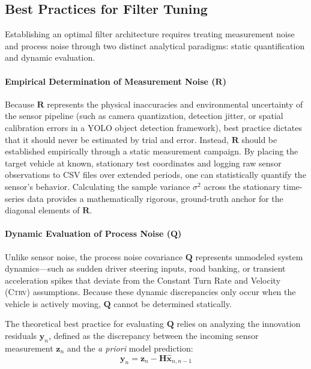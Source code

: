 \subsection{Best Practices for Filter Tuning}

Establishing an optimal filter architecture requires treating measurement noise and process noise through two distinct analytical paradigms: static quantification and dynamic evaluation.

\paragraph{Empirical Determination of Measurement Noise ($\mathbf{R}$)}
Because $\mathbf{R}$ represents the physical inaccuracies and environmental uncertainty of the sensor pipeline (such as camera quantization, detection jitter, or spatial calibration errors in a YOLO object detection framework), best practice dictates that it should never be estimated by trial and error. Instead, $\mathbf{R}$ should be established empirically through a static measurement campaign.%
By placing the target vehicle at known, stationary test coordinates and logging raw sensor observations to CSV files over extended periods, one can statistically quantify the sensor's behavior. Calculating the sample variance $\sigma^2$ across the stationary time-series data provides a mathematically rigorous, ground-truth anchor for the diagonal elements of $\mathbf{R}$.

\paragraph{Dynamic Evaluation of Process Noise ($\mathbf{Q}$)}
Unlike sensor noise, the process noise covariance $\mathbf{Q}$ represents unmodeled system dynamics—such as sudden driver steering inputs, road banking, or transient acceleration spikes that deviate from the Constant Turn Rate and Velocity (\textsc{Ctrv}) assumptions. Because these dynamic discrepancies only occur when the vehicle is actively moving, $\mathbf{Q}$ cannot be determined statically. 

The theoretical best practice for evaluating $\mathbf{Q}$ relies on analyzing the innovation residuals $\mathbf{y}_n$, defined as the discrepancy between the incoming sensor measurement $\mathbf{z}_n$ and the \emph{a priori} model prediction:%
\begin{equation}
	\mathbf{y}_n = \mathbf{z}_n - \mathbf{H} \hat{\mathbf{x}}_{n,n-1}
	\label{eq:innovation_residual}
\end{equation}

